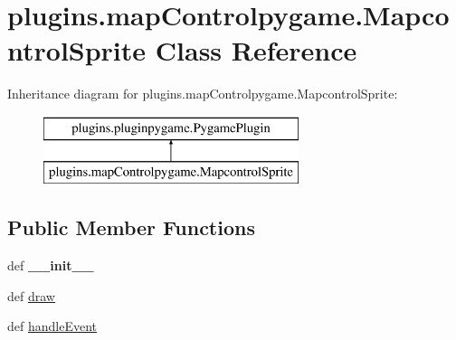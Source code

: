 \hypertarget{classplugins_1_1map_controlpygame_1_1_mapcontrol_sprite}{\section{plugins.\-map\-Controlpygame.\-Mapcontrol\-Sprite \-Class \-Reference}
\label{classplugins_1_1map_controlpygame_1_1_mapcontrol_sprite}
}
\-Inheritance diagram for plugins.\-map\-Controlpygame.\-Mapcontrol\-Sprite\-:\begin{figure}[H]
\begin{center}
\leavevmode
\includegraphics[height=2.000000cm]{classplugins_1_1map_controlpygame_1_1_mapcontrol_sprite}
\end{center}
\end{figure}
\subsection*{\-Public \-Member \-Functions}
\begin{DoxyCompactItemize}
\item 
\hypertarget{classplugins_1_1map_controlpygame_1_1_mapcontrol_sprite_ae770adda2342ec0f16566e8189397526}{def {\bfseries \-\_\-\-\_\-init\-\_\-\-\_\-}}\label{classplugins_1_1map_controlpygame_1_1_mapcontrol_sprite_ae770adda2342ec0f16566e8189397526}

\item 
def \hyperlink{classplugins_1_1map_controlpygame_1_1_mapcontrol_sprite_af410e6be00719de9d2f0968b26447bbf}{draw}
\item 
def \hyperlink{classplugins_1_1map_controlpygame_1_1_mapcontrol_sprite_af8984818b2b7c5634901dcc1332f8b1c}{handle\-Event}
\end{DoxyCompactItemize}
